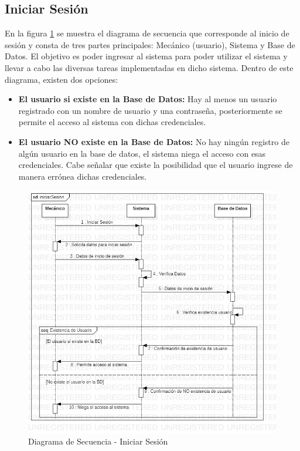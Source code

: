 \subsection{Iniciar Sesión}
En la figura \ref{fig:Diagrama de Secuencia - Iniciar Sesión} se muestra el diagrama de secuencia que corresponde al inicio de sesión y consta de tres partes principales: Mecánico (usuario), Sistema y Base de Datos. El objetivo es poder ingresar al sistema para poder utilizar el sistema y llevar a cabo las diversas tareas implementadas en dicho sistema. Dentro de este diagrama, existen dos opciones:
\begin{itemize}
	\item \textbf{El usuario si existe en la Base de Datos:} Hay al menos un usuario registrado con un nombre de usuario y una contraseña, posteriormente se permite el acceso al sistema con dichas credenciales.
	\item \textbf{El usuario NO existe en la Base de Datos:} No hay ningún registro de algún usuario en la base de datos, el sistema niega el acceso con esas credenciales. Cabe señalar que existe la posibilidad que el usuario ingrese de manera errónea dichas credenciales.
\end{itemize} 
\begin{figure}[!h]
	\centering
	\includegraphics[width=1\textwidth]{./diseno/vprocesos/imagenes/iniciarSesion}
	\caption{Diagrama de Secuencia - Iniciar Sesión}
	\label{fig:Diagrama de Secuencia - Iniciar Sesión}
\end{figure}
\clearpage